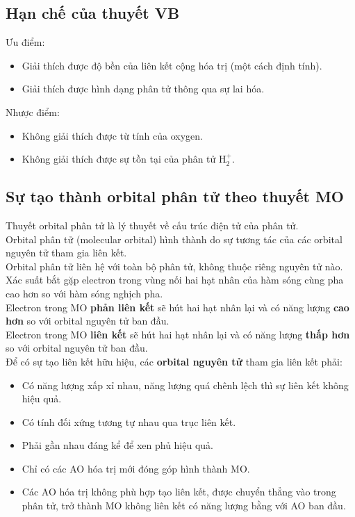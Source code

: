 \subsection{Hạn chế của thuyết VB}
Ưu điểm:
\begin{itemize}
\item Giải thích được độ bền của liên kết cộng hóa trị (một cách định tính).
\item Giải thích được hình dạng phân tử thông qua sự lai hóa.
\end{itemize}
Nhược điểm:
\begin{itemize}
\item Không giải thích được từ tính của oxygen.
\item Không giải thích được sự tồn tại của phân tử $\mathrm{H_2^+}.$
\end{itemize}
\subsection{Sự tạo thành orbital phân tử theo thuyết MO}
Thuyết orbital phân tử là lý thuyết về cấu trúc điện tử của phân tử.\\
Orbital phân tử (molecular orbital) hình thành do sự tương tác của các orbital nguyên tử tham gia liên kết.\\
Orbital phân tử liên hệ với toàn bộ phân tử, không thuộc riêng nguyên tử nào.\\
Xác suất bắt gặp electron trong vùng nối hai hạt nhân của hàm sóng cùng pha cao hơn so với hàm sóng nghịch pha.\\
Electron trong MO \textbf{phản liên kết} sẽ hút hai hạt nhân lại và có năng lượng \textbf{cao hơn} so với orbital nguyên tử ban đầu.\\
Electron trong MO \textbf{liên kết} sẽ hút hai hạt nhân lại và có năng lượng \textbf{thấp hơn} so với orbital nguyên tử ban đầu.\\
Để có sự tạo liên kết hữu hiệu, các \textbf{orbital nguyên tử} tham gia liên kết phải:
\begin{itemize}
\item Có năng lượng xấp xỉ nhau, năng lượng quá chênh lệch thì sự liên kết không hiệu quả.
\item Có tính đối xứng tương tự nhau qua trục liên kết.
\item Phải gần nhau đáng kể để xen phủ hiệu quả.
\item Chỉ có các AO hóa trị mới đóng góp hình thành MO.
\item Các AO hóa trị không phù hợp tạo liên kết, được chuyển thẳng vào trong phân tử, trở thành MO không liên kết có năng lượng bằng với AO ban đầu.
\end{itemize}
